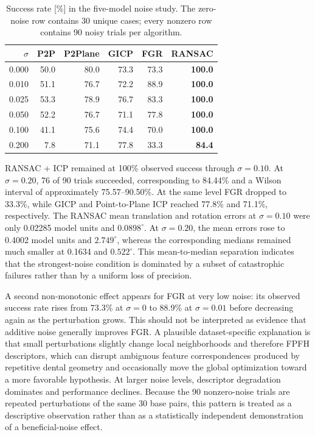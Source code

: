\begin{table}[H]
\centering
\footnotesize
\setlength{\tabcolsep}{3pt}
\begin{tabular}{rrrrrr}
\toprule
$\sigma$ & \textbf{P2P} & \textbf{P2Plane} & \textbf{GICP} & \textbf{FGR} & \textbf{RANSAC} \\
\midrule
0.000 & 50.0 & 80.0 & 73.3 & 73.3 & \textbf{100.0} \\
0.010 & 51.1 & 76.7 & 72.2 & 88.9 & \textbf{100.0} \\
0.025 & 53.3 & 78.9 & 76.7 & 83.3 & \textbf{100.0} \\
0.050 & 52.2 & 76.7 & 71.1 & 77.8 & \textbf{100.0} \\
0.100 & 41.1 & 75.6 & 74.4 & 70.0 & \textbf{100.0} \\
0.200 & 7.8 & 71.1 & 77.8 & 33.3 & \textbf{84.4} \\
\bottomrule
\end{tabular}
\caption{Success rate [\%] in the five-model noise study. The zero-noise row contains 30 unique cases; every nonzero row contains 90 noisy trials per algorithm.}
\label{tab:model-suite-noise}
\end{table}

RANSAC + ICP remained at 100\% observed success through $\sigma=0.10$. At $\sigma=0.20$, 76 of 90 trials succeeded, corresponding to 84.44\% and a Wilson interval of approximately 75.57--90.50\%. At the same level FGR dropped to 33.3\%, while GICP and Point-to-Plane ICP reached 77.8\% and 71.1\%, respectively. The RANSAC mean translation and rotation errors at $\sigma=0.10$ were only 0.02285 model units and $0.0898^\circ$. At $\sigma=0.20$, the mean errors rose to 0.4002 model units and $2.749^\circ$, whereas the corresponding medians remained much smaller at 0.1634 and $0.522^\circ$. This mean-to-median separation indicates that the strongest-noise condition is dominated by a subset of catastrophic failures rather than by a uniform loss of precision.


A second non-monotonic effect appears for FGR at very low noise: its observed success rate rises from 73.3\% at $\sigma=0$ to 88.9\% at $\sigma=0.01$ before decreasing again as the perturbation grows. This should not be interpreted as evidence that additive noise generally improves FGR. A plausible dataset-specific explanation is that small perturbations slightly change local neighborhoods and therefore FPFH descriptors, which can disrupt ambiguous feature correspondences produced by repetitive dental geometry and occasionally move the global optimization toward a more favorable hypothesis. At larger noise levels, descriptor degradation dominates and performance declines. Because the 90 nonzero-noise trials are repeated perturbations of the same 30 base pairs, this pattern is treated as a descriptive observation rather than as a statistically independent demonstration of a beneficial-noise effect.

